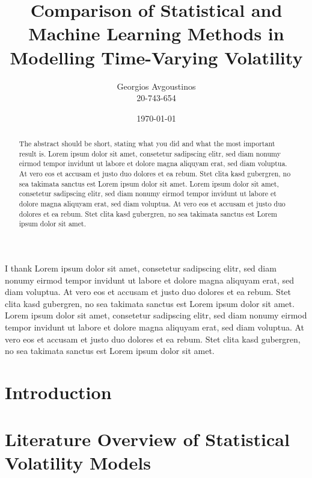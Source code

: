 \documentclass[a4paper, oneside]{discothesis}
\title{Comparison of Statistical and Machine Learning Methods in Modelling Time-Varying Volatility 
}
\author{Georgios Avgoustinos\\20-743-654}
\institute{Department of Banking and Finance\\
University of Zurich}
\date{\today}
\begin{document}
\frontmatter %
\maketitle

\cleardoublepage

\begin{acknowledgements}
	I thank Lorem ipsum dolor sit amet, consetetur sadipscing elitr, sed diam nonumy eirmod tempor invidunt ut labore et dolore magna aliquyam erat, sed diam voluptua. At vero eos et accusam et justo duo dolores et ea rebum. Stet clita kasd gubergren, no sea takimata sanctus est Lorem ipsum dolor sit amet. Lorem ipsum dolor sit amet, consetetur sadipscing elitr, sed diam nonumy eirmod tempor invidunt ut labore et dolore magna aliquyam erat, sed diam voluptua. At vero eos et accusam et justo duo dolores et ea rebum. Stet clita kasd gubergren, no sea takimata sanctus est Lorem ipsum dolor sit amet.
\end{acknowledgements}


\begin{abstract}
    The abstract should be short, stating what you did and what the most important result is.
	Lorem ipsum dolor sit amet, consetetur sadipscing elitr, sed diam nonumy eirmod tempor invidunt ut labore et dolore magna aliquyam erat, sed diam voluptua. At vero eos et accusam et justo duo dolores et ea rebum. Stet clita kasd gubergren, no sea takimata sanctus est Lorem ipsum dolor sit amet. Lorem ipsum dolor sit amet, consetetur sadipscing elitr, sed diam nonumy eirmod tempor invidunt ut labore et dolore magna aliquyam erat, sed diam voluptua. At vero eos et accusam et justo duo dolores et ea rebum. Stet clita kasd gubergren, no sea takimata sanctus est Lorem ipsum dolor sit amet.
\end{abstract}

\tableofcontents

\mainmatter %

\chapter{Introduction}


\chapter{Literature Overview of Statistical Volatility Models}
\end{document}
